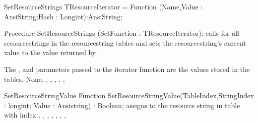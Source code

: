 \begin{procedure}{SetResourceStrings}
\Declaration
TResourceIterator =  Function (Name,Value : AnsiString;Hash : Longint):AnsiString;

Procedure SetResourceStrings (SetFunction :  TResourceIterator);
\Description
{} calls  for all resourcestrings
in the resourcestring tables and sets the resourcestring's current value
to the value returned by .

The , and  parameters passed to the iterator
function are the values stored in the tables.
\Errors
None.
\SeeAlso
{},
,
,
,
,
\end{procedure}


\begin{function}{SetResourceStringValue}
\Declaration
Function SetResourceStringValue(TableIndex,StringIndex : longint; Value : Ansistring) : Boolean;
\Description
{} assigns  to the resource string in
table  with index .
\Errors
\SeeAlso
{},
,
,
,
,
,
\end{function}



%
%
\printindex
